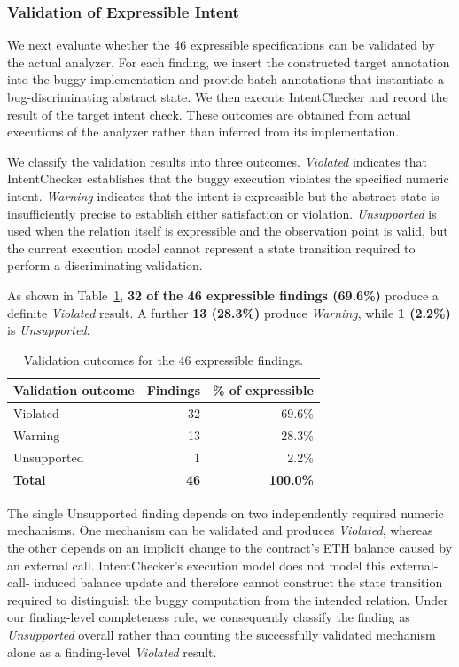 \documentclass[pdflatex,sn-basic]{sn-jnl}%
\theoremstyle{thmstyleone}%
\theoremstyle{thmstyletwo}%
\theoremstyle{thmstylethree}%
\begin{document}
\subsubsection{Validation of Expressible Intent}\label{sec:rq1:validation}

We next evaluate whether the 46 expressible specifications can be validated by the
actual analyzer. For each finding, we insert the constructed target annotation into
the buggy implementation and provide batch annotations that instantiate a
bug-discriminating abstract state. We then execute IntentChecker and record the
result of the target intent check. These outcomes are obtained from actual executions
of the analyzer rather than inferred from its implementation.

We classify the validation results into three outcomes. \textit{Violated} indicates
that IntentChecker establishes that the buggy execution violates the specified
numeric intent. \textit{Warning} indicates that the intent is expressible but the
abstract state is insufficiently precise to establish either satisfaction or
violation. \textit{Unsupported} is used when the relation itself is expressible and
the observation point is valid, but the current execution model cannot represent a
state transition required to perform a discriminating validation.

As shown in Table~\ref{tab:rq1-validation}, \textbf{32 of the 46 expressible
findings (69.6\%)} produce a definite \textit{Violated} result.
A further \textbf{13 (28.3\%)} produce \textit{Warning}, while
\textbf{1 (2.2\%)} is \textit{Unsupported}.

\begin{table}[t]
\centering
\caption{Validation outcomes for the 46 expressible findings.}
\label{tab:rq1-validation}
\small
\begin{tabular}{lrr}
\toprule
\textbf{Validation outcome} & \textbf{Findings} & \textbf{\% of expressible} \\
\midrule
Violated    & 32 & 69.6\% \\
Warning     & 13 & 28.3\% \\
Unsupported &  1 &  2.2\% \\
\midrule
\textbf{Total} & \textbf{46} & \textbf{100.0\%} \\
\bottomrule
\end{tabular}
\end{table}

The single Unsupported finding depends on two independently required numeric
mechanisms. One mechanism can be validated and produces \textit{Violated}, whereas
the other depends on an implicit change to the contract's ETH balance caused by an
external call. IntentChecker's execution model does not model this external-call-
induced balance update and therefore cannot construct the state transition required
to distinguish the buggy computation from the intended relation. Under our
finding-level completeness rule, we consequently classify the finding as
\textit{Unsupported} overall rather than counting the successfully validated
mechanism alone as a finding-level \textit{Violated} result.
\end{document}
